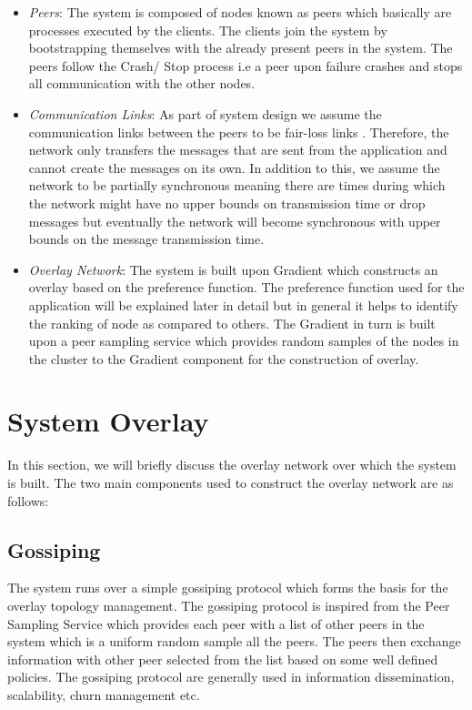 \documentclass[12pt,a4paper,twoside,openright]{book}
\begin{document}
\begin{itemize}

\item \textit{Peers}: The system is composed of nodes known as peers which basically are processes executed by the clients. The clients join the system by bootstrapping themselves with the already present peers in the system. The peers follow the Crash/ Stop process \cite{guerraoui} i.e a peer upon failure crashes and stops all communication with the other nodes.  


\item \textit{Communication Links}: As part of system design we assume the communication links between the peers to be fair-loss links \cite{guerraoui}. Therefore, the network only transfers the messages that are sent from the application and cannot create the messages on its own. In addition to this, we assume the network to be partially synchronous meaning there are times during which the network might have no upper bounds on transmission time or drop messages but eventually the network will become synchronous with upper bounds on the message transmission time.

\item \textit{Overlay Network}: The system is built upon Gradient \cite{sacha2006discovery} which constructs an overlay based on the preference function. The preference function used for the application will be explained later in detail but in general it helps to identify the ranking of node as compared to others. The Gradient in turn is built upon a peer sampling service which provides random samples of the nodes in the cluster to the Gradient component for the construction of overlay.

\end{itemize}



\section{System Overlay}
In this section, we will briefly discuss the overlay network over which the system is built. The two main components used to construct the overlay network are as follows: 

\subsection{Gossiping}
The system runs over a simple gossiping protocol which forms the basis for the overlay topology management. The gossiping protocol is inspired from the Peer Sampling Service \cite{samplingService} which provides each peer with a list of other peers in the system which is a uniform random sample  all the peers. The peers then exchange information with other peer selected from the list based on some well defined policies. The gossiping protocol are generally used in information dissemination, scalability, churn management etc.
\end{document}
